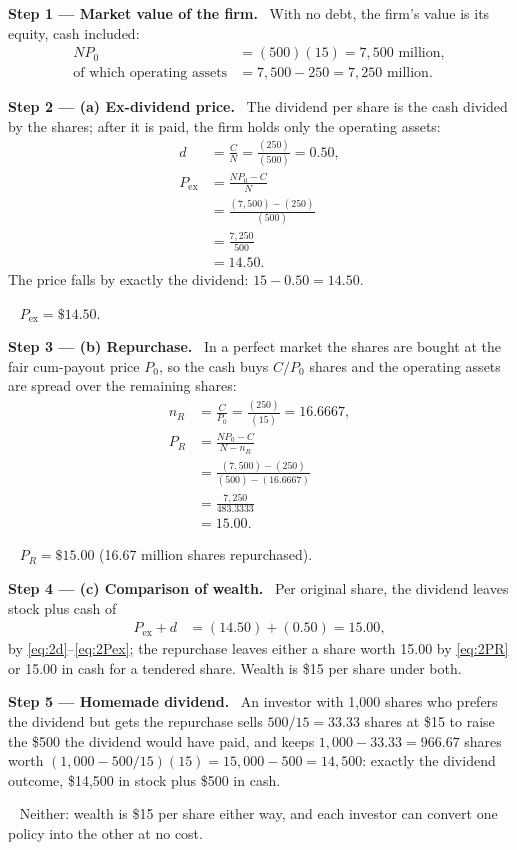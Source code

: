 \documentclass[11pt,a4paper]{article}
\numberwithin{equation}{section}
\newcommand{\step}[2]{\par\smallskip\noindent\textbf{Step #1 --- #2.}~}
\newcommand{\answer}[1]{\par\smallskip\noindent\fbox{\textbf{Answer #1.}}~}
\begin{document}
\step{1}{Market value of the firm} With no debt, the firm's value is its equity, cash included:
\begin{align}
  N P_0 &= (500)(15) = 7{,}500 \text{ million}, \nonumber\\
  \text{of which operating assets} &= 7{,}500-250 = 7{,}250 \text{ million}. \nonumber
\end{align}

\step{2}{(a) Ex-dividend price} The dividend per share is the cash divided by the shares; after
it is paid, the firm holds only the operating assets:
\begin{align}
  d &= \frac{C}{N}=\frac{(250)}{(500)}=0.50, \label{eq:2d}\\
  P_{\text{ex}} &= \frac{N P_0 - C}{N} \label{eq:2Pex}\\
     &= \frac{(7{,}500)-(250)}{(500)} \nonumber\\
     &= \frac{7{,}250}{500} \nonumber\\
     &= 14.50. \nonumber
\end{align}
The price falls by exactly the dividend: $15-0.50=14.50$.
\answer{(a)} $P_{\text{ex}}=\$14.50$.

\step{3}{(b) Repurchase} In a perfect market the shares are bought at the fair cum-payout price
$P_0$, so the cash buys $C/P_0$ shares and the operating assets are spread over the remaining
shares:
\begin{align}
  n_R &= \frac{C}{P_0}=\frac{(250)}{(15)}=16.6667, \label{eq:2nR}\\
  P_R &= \frac{N P_0 - C}{N-n_R} \label{eq:2PR}\\
      &= \frac{(7{,}500)-(250)}{(500)-(16.6667)} \nonumber\\
      &= \frac{7{,}250}{483.3333} \nonumber\\
      &= 15.00. \nonumber
\end{align}
\answer{(b)} $P_R=\$15.00$ (16.67 million shares repurchased).

\step{4}{(c) Comparison of wealth} Per original share, the dividend leaves stock plus cash of
\begin{align}
  P_{\text{ex}}+d &= (14.50)+(0.50) = 15.00, \nonumber
\end{align}
by \eqref{eq:2d}--\eqref{eq:2Pex}; the repurchase leaves either a share worth 15.00 by
\eqref{eq:2PR} or 15.00 in cash for a tendered share. Wealth is \$15 per share under both.

\step{5}{Homemade dividend} An investor with 1{,}000 shares who prefers the dividend but gets the
repurchase sells $500/15=33.33$ shares at \$15 to raise the \$500 the dividend would have paid,
and keeps $1{,}000-33.33=966.67$ shares worth $(1{,}000-500/15)(15)=15{,}000-500=14{,}500$: exactly the dividend
outcome, \$14{,}500 in stock plus \$500 in cash.
\answer{(c)} Neither: wealth is \$15 per share either way, and each investor can convert one
policy into the other at no cost.
\end{document}
